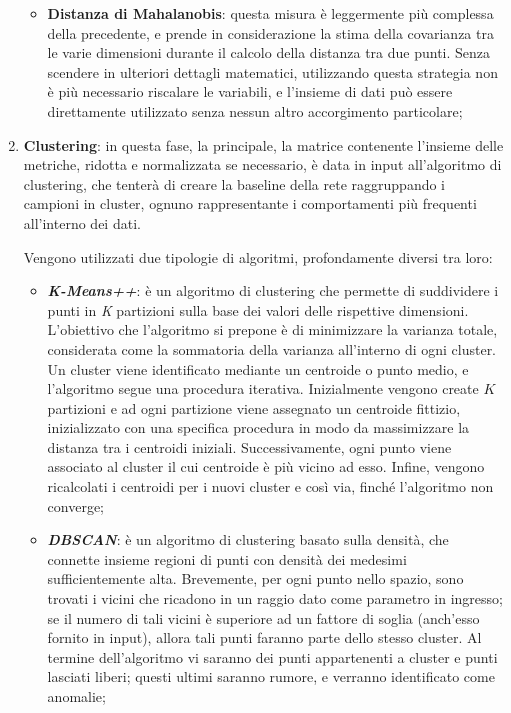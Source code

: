 \documentclass[12pt,a4paper,cucitura]{toptesi}
\begin{document}
\begin{enumerate}
\begin{itemize}
\item \textbf{Distanza di Mahalanobis}: questa misura è leggermente più complessa della precedente, e prende in considerazione la stima della covarianza tra le varie dimensioni durante il calcolo della distanza tra due punti. Senza scendere in ulteriori dettagli matematici, utilizzando questa strategia non è più necessario riscalare le variabili, e l'insieme di dati può essere direttamente utilizzato senza nessun altro accorgimento particolare;
\end{itemize}

\item \textbf{Clustering}: in questa fase, la principale, la matrice contenente l'insieme delle metriche, ridotta e normalizzata se necessario, è data in input all'algoritmo di clustering, che tenterà di creare la baseline della rete raggruppando i campioni in cluster, ognuno rappresentante i comportamenti più frequenti all'interno dei dati.
 
Vengono utilizzati due tipologie di algoritmi, profondamente diversi tra loro:
\begin{itemize}
\item \textbf{\emph{K-Means++}}: è un algoritmo di clustering che permette di suddividere i punti in \emph{K} partizioni sulla base dei valori delle rispettive dimensioni. L'obiettivo che l'algoritmo si prepone è di minimizzare la varianza totale, considerata come la sommatoria della varianza all'interno di ogni cluster. Un cluster viene identificato mediante un centroide o punto medio, e l'algoritmo segue una procedura iterativa. Inizialmente vengono create $K$ partizioni e ad ogni partizione viene assegnato un centroide fittizio, inizializzato con una specifica procedura in modo da massimizzare la distanza tra i centroidi iniziali. Successivamente, ogni punto viene associato al cluster il cui centroide è più vicino ad esso. Infine, vengono ricalcolati i centroidi per i nuovi cluster e così via, finché l'algoritmo non converge;
\item \textbf{\emph{DBSCAN}}: è un algoritmo di clustering basato sulla densità, che connette insieme regioni di punti con densità dei medesimi sufficientemente alta.
Brevemente, per ogni punto nello spazio, sono trovati i vicini che ricadono in un raggio dato come parametro in ingresso; se il numero di tali vicini è superiore ad un fattore di soglia (anch'esso fornito in input), allora tali punti faranno parte dello stesso cluster.
Al termine dell'algoritmo vi saranno dei punti appartenenti a cluster e punti lasciati liberi; questi ultimi saranno rumore, e verranno identificato come anomalie;


\end{itemize}
\end{enumerate}
\end{document}
